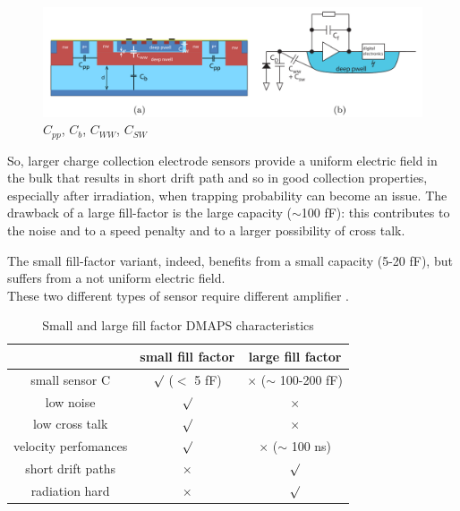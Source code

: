 \begin{figure}[h!]
   \centering\includegraphics[width=12cm]{figures/DMAPS_capacity.png}
   \caption{$C_{pp}$, $C_{b}$, $C_{WW}$, $C_{SW}$}
   \label{fig:DMAPS_capacity}
\end{figure}
So, larger charge collection electrode sensors provide a uniform electric field in the bulk that results in short drift path and so in good collection properties, especially after irradiation, when trapping probability can become an issue. The drawback of a large fill-factor is the large capacity ($\sim$100 fF): this contributes to the noise and to a speed penalty and to a larger possibility of cross talk.

The small fill-factor variant, indeed, benefits from a small capacity (5-20 fF), but suffers from a not uniform electric field. \\
These two different types of sensor require different amplifier .


\begin{table}
   \begin{center}
   \begin{tabular}{|c | c |c |}
   \hline
   & small fill factor & large fill factor\\
   \hline
   \hline
   small sensor C & $\surd$ ($<$ 5 fF) & $\times$ ($\sim$ 100-200 fF)\\
   low noise & $\surd$ & $\times$\\
   low cross talk & $\surd$ & $\times$ \\
   velocity perfomances & $\surd$ & $\times$ ($\sim$ 100 ns)\\
   short drift paths & $\times$ & $\surd$ \\
   radiation hard & $\times$ & $\surd$ \\
   \hline
   \end{tabular}
   \caption{Small and large fill factor DMAPS characteristics}
   \label{tab:DMAPS_large_small_fillfactor}
   \end{center}
\end{table}

